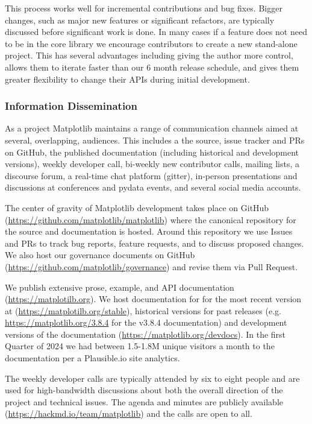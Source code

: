 \documentclass[12pt]{article}
\numberwithin{page}{section}
\begin{document}
This process works well for incremental contributions and bug fixes.  Bigger
changes, such as major new features or significant refactors, are typically
discussed before significant work is done.  In many cases if a feature does not
need to be in the core library we encourage contributors to create a new
stand-alone project.  This has several advantages including giving the
author more control, allows them to iterate faster than our 6 month release
schedule, and gives them greater flexibility to change their APIs during
initial development.

\subsubsection{Information Dissemination}

As a project Matplotlib maintains a range of communication channels
aimed at several, overlapping, audiences.  This includes a
the source, issue tracker and PRs on GitHub,
the published documentation (including historical and development versions),
weekly developer call,
bi-weekly new contributor calls,
mailing lists,
a discourse forum,
a real-time chat platform (gitter),
in-person presentations and discussions at conferences and pydata events,
and several social media accounts.


The center of gravity of Matplotlib development takes place on GitHub
(\url{https://github.com/matplotlib/matplotlib}) where the canonical
repository for the source and documentation is hosted.  Around this
repository we use Issues and PRs to track bug reports, feature
requests, and to discuss proposed changes.  We also host our
governance documents on GitHub
(\url{https://github.com/matplotlib/governance}) and revise them via
Pull Request.

We publish extensive prose, example, and API documentation
(\url{https://matplotilb.org}).  We host documentation for for the most recent
version at (\url{https://matplotilb.org/stable}), historical versions for past
releases (e.g. \url{https://matplotlib.org/3.8.4} for the v3.8.4 documentation)
and development versions of the documentation
(\url{https://matplotlib.org/devdocs}).  In the first Quarter of 2024 we had
between 1.5-1.8M unique visitors a month to the documentation per a
Plausible.io site analytics.

The weekly developer calls are typically attended by six to eight people and
are used for high-bandwidth discussions about both the overall direction of the
project and technical issues.  The agenda and minutes are publicly available
(\url{https://hackmd.io/team/matplotlib}) and the calls are open to all.
\end{document}
